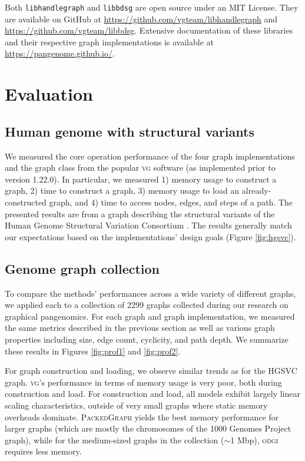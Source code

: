 \documentclass{article}
\begin{document}
Both \texttt{libhandlegraph} and \texttt{libbdsg} are open source under an MIT License.
They are available on GitHub at \url{https://github.com/vgteam/libhandlegraph} and \url{https://github.com/vgteam/libbdsg}.
Extensive documentation of these libraries and their respective graph implementations is available at \url{https://pangenome.github.io/}.

\section{Evaluation}

\subsection{Human genome with structural variants}

We measured the core operation performance of the four graph implementations and the graph class from the popular \textsc{vg} software (as implemented prior to version 1.22.0).
In particular, we measured 1) memory usage to construct a graph, 2) time to construct a graph, 3) memory usage to load an already-constructed graph, and 4) time to access nodes, edges, and steps of a path.
The presented results are from a graph describing the structural variants of the Human Genome Structural Variation Consortium \cite{chaisson2019multi}.
The results generally match our expectations based on the implementations' design goals (Figure \ref{fig:hgsvc}).

\subsection{Genome graph collection}

To compare the methods' performances across a wide variety of different graphs, we applied each to a collection of 2299 graphs collected during our research on graphical pangenomics.
For each graph and graph implementation, we measured the same metrics described in the previous section as well as various graph properties including size, edge count, cyclicity, and path depth.
We summarize these results in Figures \ref{fig:prof1} and \ref{fig:prof2}.

For graph construction and loading, we observe similar trends as for the HGSVC graph.
\textsc{vg}'s performance in terms of memory usage is very poor, both during construction and load.
For construction and load, all models exhibit largely linear scaling characteristics, outside of very small graphs where static memory overheads dominate.
\textsc{PackedGraph} yields the best memory performance for larger graphs (which are mostly the chromosomes of the 1000 Genomes Project graph), while for the medium-sized graphs in the collection ($\sim$1 Mbp), \textsc{odgi} requires less memory.
\end{document}
